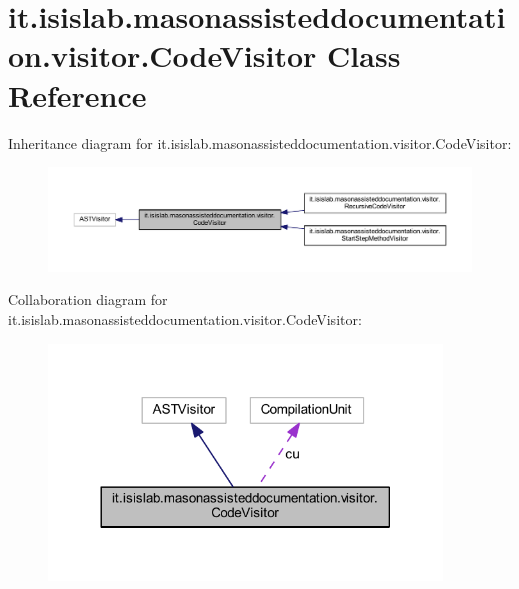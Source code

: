 \hypertarget{classit_1_1isislab_1_1masonassisteddocumentation_1_1visitor_1_1_code_visitor}{\section{it.\-isislab.\-masonassisteddocumentation.\-visitor.\-Code\-Visitor Class Reference}
\label{classit_1_1isislab_1_1masonassisteddocumentation_1_1visitor_1_1_code_visitor}
}


Inheritance diagram for it.\-isislab.\-masonassisteddocumentation.\-visitor.\-Code\-Visitor\-:
\nopagebreak
\begin{figure}[H]
\begin{center}
\leavevmode
\includegraphics[width=350pt]{classit_1_1isislab_1_1masonassisteddocumentation_1_1visitor_1_1_code_visitor__inherit__graph}
\end{center}
\end{figure}


Collaboration diagram for it.\-isislab.\-masonassisteddocumentation.\-visitor.\-Code\-Visitor\-:
\nopagebreak
\begin{figure}[H]
\begin{center}
\leavevmode
\includegraphics[width=296pt]{classit_1_1isislab_1_1masonassisteddocumentation_1_1visitor_1_1_code_visitor__coll__graph}
\end{center}
\end{figure}
